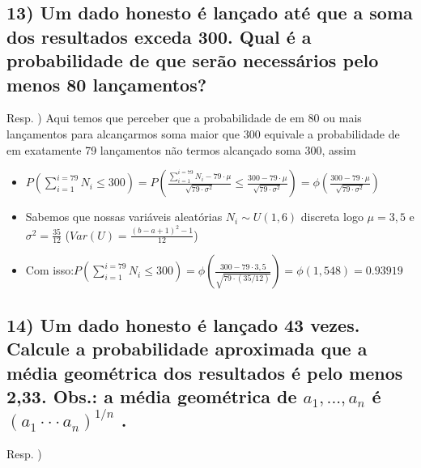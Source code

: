 \documentclass[portuguese]{article}
\begin{document}
\subsection*{\textcompwordmark{}}


\subsection*{\textmd{13) Um dado honesto é lançado até que a soma dos resultados
exceda 300. Qual é a probabilidade de que serão necessários pelo menos
80 lançamentos?}}

Resp. ) Aqui temos que perceber que a probabilidade de em 80 ou mais
lançamentos para alcançarmos soma maior que 300 equivale a probabilidade
de em exatamente 79 lançamentos não termos alcançado soma 300, assim
\begin{itemize}
\item $P(\sum_{i=1}^{i=79}N_{i}\le300)=P(\frac{\sum_{i=1}^{i=79}N_{i}-79\cdot\mu}{\sqrt{79\cdot\sigma^{2}}}\le\frac{300-79\cdot\mu}{\sqrt{79\cdot\sigma^{2}}})=\phi(\frac{300-79\cdot\mu}{\sqrt{79\cdot\sigma^{2}}})$
\item Sabemos que nossas variáveis aleatórias $N_{i}\sim U(1,6)$ discreta
logo $\mu=3,5$ e $\sigma^{2}=\frac{35}{12}$ ($Var(U)=\frac{(b-a+1)^{2}-1}{12}$)
\item Com isso:$P(\sum_{i=1}^{i=79}N_{i}\le300)=\phi(\frac{300-79\cdot3,5}{\sqrt{79\cdot(35/12)}})=\phi(1,548)=0.93919$
\end{itemize}

\subsection*{\textcompwordmark{}}


\subsection*{\textmd{14) Um dado honesto é lançado 43 vezes. Calcule a probabilidade
aproximada que a média geométrica dos resultados é pelo menos 2,33.
Obs.: a média geométrica de $a_{1},...,a_{n}$ é $(a_{1}\cdot\cdot\cdot a_{n})^{1/n}$
.}}

Resp. )
\end{document}
